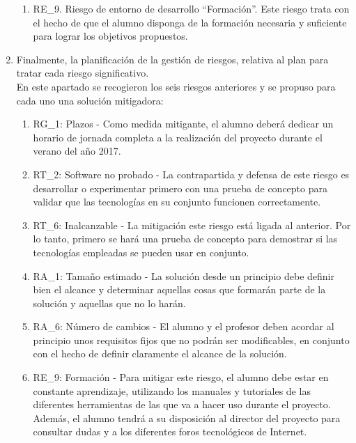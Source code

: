 \begin{enumerate}
\begin{enumerate}
\item RE\_9. Riesgo de entorno de desarrollo “Formación”. Este riesgo trata con el hecho de que el alumno disponga de la formación necesaria y suficiente para lograr los objetivos propuestos.
\end{enumerate}
\item Finalmente, la planificación de la gestión de riesgos, relativa al plan para tratar cada riesgo significativo.\\
En este apartado se recogieron los seis riesgos anteriores y se propuso para cada uno una solución mitigadora: 
\begin{enumerate}
\item RG\_1: Plazos - Como medida mitigante, el alumno deberá dedicar un horario de jornada completa a la realización del proyecto durante el verano del año 2017. 
\item RT\_2: Software no probado - La contrapartida y defensa de este riesgo es desarrollar o experimentar primero con una prueba de concepto para validar que las tecnologías en su conjunto funcionen correctamente. 
\item RT\_6: Inalcanzable - La mitigación este riesgo está ligada al anterior. Por lo tanto, primero se hará una prueba de concepto para demostrar si las tecnologías empleadas se pueden usar en conjunto.
\item RA\_1: Tamaño estimado - La solución desde un principio debe definir bien el alcance y determinar aquellas cosas que formarán parte de la solución y aquellas que no lo harán. 
\item RA\_6: Número de cambios - El alumno y el profesor deben acordar al principio unos requisitos fijos que no podrán ser modificables, en conjunto con el hecho de definir claramente el alcance de la solución.
\item RE\_9: Formación - Para mitigar este riesgo, el alumno debe estar en constante aprendizaje, utilizando los manuales y tutoriales de las diferentes herramientas de las que va a hacer uso durante el proyecto. Además, el alumno tendrá a su disposición al director del proyecto para consultar dudas y a los diferentes foros tecnológicos de Internet. 
\end{enumerate}
\end{enumerate}

